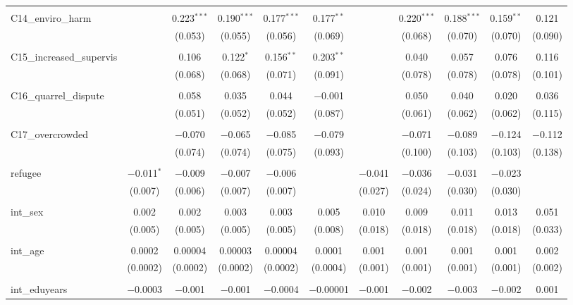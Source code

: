 \begin{table}[H]
\begin{tabular}{@{\extracolsep{4pt}}lcccccccccc}
  & & & & & & & & & & \\ 
 C14\_enviro\_harm &  & 0.223$^{***}$ & 0.190$^{***}$ & 0.177$^{***}$ & 0.177$^{**}$ &  & 0.220$^{***}$ & 0.188$^{***}$ & 0.159$^{**}$ & 0.121 \\ 
  &  & (0.053) & (0.055) & (0.056) & (0.069) &  & (0.068) & (0.070) & (0.070) & (0.090) \\ 
  & & & & & & & & & & \\ 
 C15\_increased\_supervis &  & 0.106 & 0.122$^{*}$ & 0.156$^{**}$ & 0.203$^{**}$ &  & 0.040 & 0.057 & 0.076 & 0.116 \\ 
  &  & (0.068) & (0.068) & (0.071) & (0.091) &  & (0.078) & (0.078) & (0.078) & (0.101) \\ 
  & & & & & & & & & & \\ 
 C16\_quarrel\_dispute &  & 0.058 & 0.035 & 0.044 & $-$0.001 &  & 0.050 & 0.040 & 0.020 & 0.036 \\ 
  &  & (0.051) & (0.052) & (0.052) & (0.087) &  & (0.061) & (0.062) & (0.062) & (0.115) \\ 
  & & & & & & & & & & \\ 
 C17\_overcrowded &  & $-$0.070 & $-$0.065 & $-$0.085 & $-$0.079 &  & $-$0.071 & $-$0.089 & $-$0.124 & $-$0.112 \\ 
  &  & (0.074) & (0.074) & (0.075) & (0.093) &  & (0.100) & (0.103) & (0.103) & (0.138) \\ 
  & & & & & & & & & & \\ 
 refugee & $-$0.011$^{*}$ & $-$0.009 & $-$0.007 & $-$0.006 &  & $-$0.041 & $-$0.036 & $-$0.031 & $-$0.023 &  \\ 
  & (0.007) & (0.006) & (0.007) & (0.007) &  & (0.027) & (0.024) & (0.030) & (0.030) &  \\ 
  & & & & & & & & & & \\ 
 int\_sex & 0.002 & 0.002 & 0.003 & 0.003 & 0.005 & 0.010 & 0.009 & 0.011 & 0.013 & 0.051 \\ 
  & (0.005) & (0.005) & (0.005) & (0.005) & (0.008) & (0.018) & (0.018) & (0.018) & (0.018) & (0.033) \\ 
  & & & & & & & & & & \\ 
 int\_age & 0.0002 & 0.00004 & 0.00003 & 0.00004 & 0.0001 & 0.001 & 0.001 & 0.001 & 0.001 & 0.002 \\ 
  & (0.0002) & (0.0002) & (0.0002) & (0.0002) & (0.0004) & (0.001) & (0.001) & (0.001) & (0.001) & (0.002) \\ 
  & & & & & & & & & & \\ 
 int\_eduyears & $-$0.0003 & $-$0.001 & $-$0.001 & $-$0.0004 & $-$0.00001 & $-$0.001 & $-$0.002 & $-$0.003 & $-$0.002 & 0.001 \\ 

\end{tabular}
\end{table}
